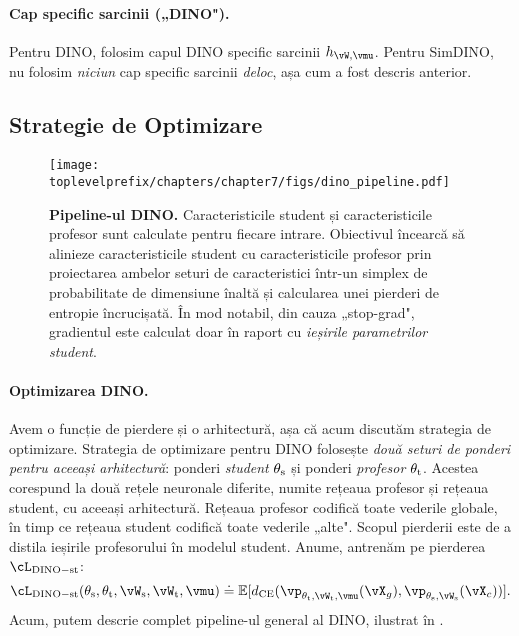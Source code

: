 \documentclass[../../book-main_ro.tex]{subfiles}
\begin{document}
\paragraph{Cap specific sarcinii („DINO").} Pentru DINO, folosim capul DINO specific sarcinii \(h_{\vW, \vmu}\). Pentru SimDINO, nu folosim \textit{niciun} cap specific sarcinii \textit{deloc}, așa cum a fost descris anterior.

\subsection{Strategie de Optimizare}\label{sub:contrastive_learning_optimization}

\begin{figure}
    \centering 
    \texttt{[image: \\toplevelprefix/chapters/chapter7/figs/dino\_pipeline.pdf]}
    \caption{\small \textbf{Pipeline-ul DINO.} Caracteristicile student și caracteristicile profesor sunt calculate pentru fiecare intrare. Obiectivul încearcă să alinieze caracteristicile student cu caracteristicile profesor prin proiectarea ambelor seturi de caracteristici într-un simplex de probabilitate de dimensiune înaltă și calcularea unei pierderi de entropie încrucișată. În mod notabil, din cauza „stop-grad", gradientul este calculat doar în raport cu \textit{ieșirile parametrilor student}.}
    \label{fig:dino_pipeline}
\end{figure}

\paragraph{Optimizarea DINO.} Avem o funcție de pierdere și o arhitectură, așa că acum discutăm strategia de optimizare. Strategia de optimizare pentru DINO folosește \textit{două seturi de ponderi pentru aceeași arhitectură}: ponderi \textit{student} \(\theta_{\mathrm{s}}\) și ponderi \textit{profesor} \(\theta_{\mathrm{t}}\). Acestea corespund la două rețele neuronale diferite, numite rețeaua profesor și rețeaua student, cu aceeași arhitectură. Rețeaua profesor codifică toate vederile globale, în timp ce rețeaua student codifică toate vederile „alte". Scopul pierderii este de a distila ieșirile profesorului în modelul student. Anume, antrenăm pe pierderea \(\cL_{\dino{}-\student\teacher}\):
\begin{equation}\label{eq:dino_loss_teacherstudent}
    \cL_{\dino{}-\student\teacher}(\theta_{\student}, \theta_{\teacher}, \vW_{\student}, \vW_{\teacher}, \vmu) \doteq \Ex[d_{\CE}(\vp_{\theta_{\teacher}, \vW_{\teacher}, \vmu}(\vX_{g}), \vp_{\theta_{\student}, \vW_{\student}}(\vX_{c}))].
\end{equation}
Acum, putem descrie complet pipeline-ul general al DINO, ilustrat în .
\end{document}
